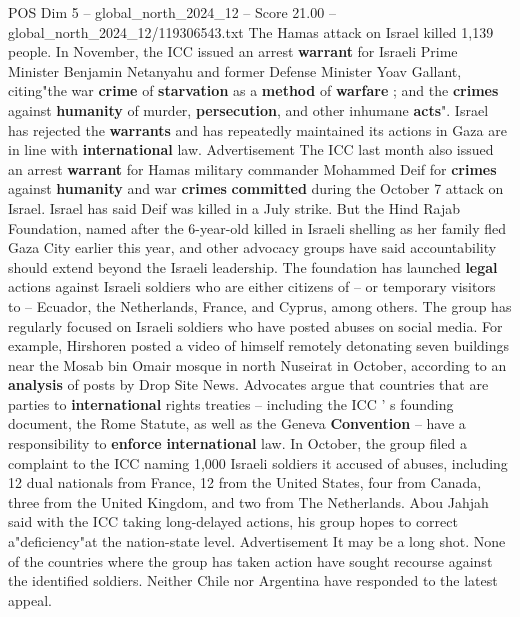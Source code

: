 \begin{textsample}{POS Dim 5 – global\_north\_2024\_12 – Score 21.00 – global\_north\_2024\_12/119306543.txt}
The Hamas attack on Israel killed 1,139 people.
In November, the ICC issued an arrest \textbf{warrant} for Israeli Prime Minister Benjamin Netanyahu and former Defense Minister Yoav Gallant, citing"the war \textbf{crime} of \textbf{starvation} as a \textbf{method} of \textbf{warfare} ; and the \textbf{crimes} against \textbf{humanity} of murder, \textbf{persecution}, and other inhumane \textbf{acts}".
Israel has rejected the \textbf{warrants} and has repeatedly maintained its actions in Gaza are in line with \textbf{international} law.
Advertisement The ICC last month also issued an arrest \textbf{warrant} for Hamas military commander Mohammed Deif for \textbf{crimes} against \textbf{humanity} and war \textbf{crimes} \textbf{committed} during the October 7 attack on Israel.
Israel has said Deif was killed in a July strike.
But the Hind Rajab Foundation, named after the 6-year-old killed in Israeli shelling as her family fled Gaza City earlier this year, and other advocacy groups have said accountability should extend beyond the Israeli leadership.
The foundation has launched \textbf{legal} actions against Israeli soldiers who are either citizens of -- or temporary visitors to -- Ecuador, the Netherlands, France, and Cyprus, among others.
The group has regularly focused on Israeli soldiers who have posted abuses on social media.
For example, Hirshoren posted a video of himself remotely detonating seven buildings near the Mosab bin Omair mosque in north Nuseirat in October, according to an \textbf{analysis} of posts by Drop Site News.
Advocates argue that countries that are parties to \textbf{international} rights treaties -- including the ICC ' s founding document, the Rome Statute, as well as the Geneva \textbf{Convention} -- have a responsibility to \textbf{enforce} \textbf{international} law.
In October, the group filed a complaint to the ICC naming 1,000 Israeli soldiers it accused of abuses, including 12 dual nationals from France, 12 from the United States, four from Canada, three from the United Kingdom, and two from The Netherlands.
Abou Jahjah said with the ICC taking long-delayed actions, his group hopes to correct a"deficiency"at the nation-state level.
Advertisement It may be a long shot.
None of the countries where the group has taken action have sought recourse against the identified soldiers.
Neither Chile nor Argentina have responded to the latest appeal.

\end{textsample}
